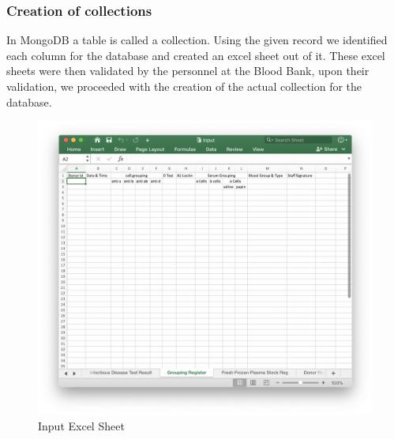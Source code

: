 \documentclass[BTech]{srmuthesis}
\begin{document}
\subsubsection{Creation of collections}
In MongoDB a table is called a collection. Using the given record we identified each column for the database and created an excel sheet out of it. These excel sheets were then validated by the personnel at the Blood Bank, upon their validation, we proceeded with the creation of the actual collection for the database.\par
\begin{figure}[H]
	\centering
	\includegraphics[scale=0.65]{excel.png}
	\caption{Input Excel Sheet}
\end{figure}
\end{document}
